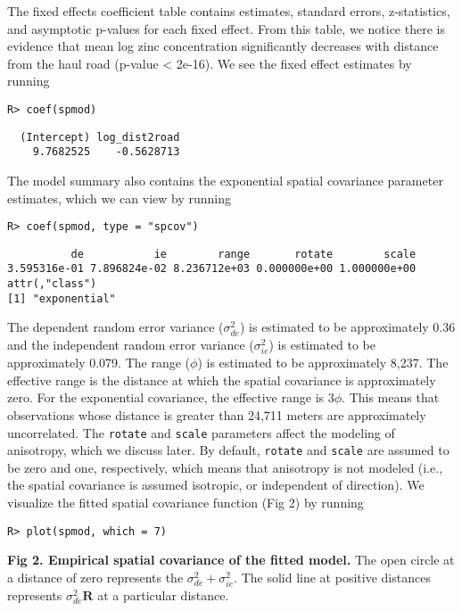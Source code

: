 \documentclass[10pt,letterpaper]{article}
\begin{document}
\noindent The fixed effects coefficient table contains estimates,
standard errors, z-statistics, and asymptotic p-values for each fixed
effect. From this table, we notice there is evidence that mean log zinc
concentration significantly decreases with distance from the haul road
(p-value \textless{} 2e-16). We see the fixed effect estimates by
running

\begin{verbatim}
R> coef(spmod)
\end{verbatim}

\begin{verbatim}
  (Intercept) log_dist2road 
    9.7682525    -0.5628713 
\end{verbatim}

\noindent The model summary also contains the exponential spatial
covariance parameter estimates, which we can view by running

\begin{verbatim}
R> coef(spmod, type = "spcov")
\end{verbatim}

\begin{verbatim}
          de           ie        range       rotate        scale 
3.595316e-01 7.896824e-02 8.236712e+03 0.000000e+00 1.000000e+00 
attr(,"class")
[1] "exponential"
\end{verbatim}

\noindent The dependent random error variance (\(\sigma^2_{de}\)) is
estimated to be approximately 0.36 and the independent random error
variance (\(\sigma^2_{ie}\)) is estimated to be approximately 0.079. The
range (\(\phi\)) is estimated to be approximately 8,237. The effective
range is the distance at which the spatial covariance is approximately
zero. For the exponential covariance, the effective range is \(3\phi\).
This means that observations whose distance is greater than 24,711
meters are approximately uncorrelated. The \texttt{rotate} and
\texttt{scale} parameters affect the modeling of anisotropy, which we
discuss later. By default, \texttt{rotate} and \texttt{scale} are
assumed to be zero and one, respectively, which means that anisotropy is
not modeled (i.e., the spatial covariance is assumed isotropic, or
independent of direction). We visualize the fitted spatial covariance
function (Fig 2) by running

\begin{verbatim}
R> plot(spmod, which = 7)
\end{verbatim}

\textbf{Fig 2. Empirical spatial covariance of the fitted model.} The
open circle at a distance of zero represents the
\(\sigma^2_{de} + \sigma^2_{ie}\). The solid line at positive distances
represents \(\sigma^2_{de} \mathbf{R}\) at a particular distance.
\end{document}
